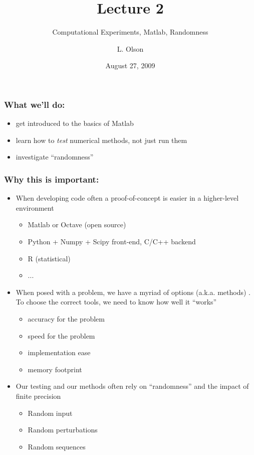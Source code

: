 \documentclass[10pt]{beamer}
\author{L. Olson}
\institute[UIUC]
{Department of Computer Science\\
University of Illinois at Urbana-Champaign\\
\vspace{0.5cm}
}
\title[CS 357]{Lecture 2}
\subtitle{Computational Experiments, Matlab, Randomness}
\date{August 27, 2009}
\begin{document}
\begin{frame}
  \titlepage
\end{frame}
\begin{frame}
\frametitle{What we'll do:}
\begin{itemize}
  \item get introduced to the basics of Matlab
  \item learn how to \emph{test} numerical methods, not just run them
  \item investigate ``randomness''
\end{itemize}
\end{frame}
\begin{frame}
\frametitle{Why this is important:}
\begin{itemize} 
  \item When developing code often a proof-of-concept is easier in a
higher-level environment
    \begin{itemize}
      \item Matlab or Octave (open source)
      \item Python + Numpy + Scipy front-end, C/C++ backend
      \item R (statistical)
      \item ...
    \end{itemize}
  \item When posed with a problem, we have a myriad of options (a.k.a. methods)
.  To choose the correct tools, we need to know how well it ``works''
    \begin{itemize}
      \item accuracy for the problem
      \item speed for the problem
      \item implementation ease
      \item memory footprint
    \end{itemize}
  \item Our testing and our methods often rely on ``randomness'' and the impact
of finite precision
    \begin{itemize}
      \item Random input
      \item Random perturbations
      \item Random sequences
    \end{itemize}
\end{itemize}
\end{frame}
\end{document}
